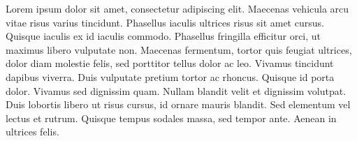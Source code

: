 \label{an:dinamica-das-classes-sociais}

Lorem ipsum dolor sit amet, consectetur adipiscing elit. Maecenas vehicula arcu vitae risus varius tincidunt. Phasellus iaculis ultrices risus sit amet cursus. Quisque iaculis ex id iaculis commodo. Phasellus fringilla efficitur orci, ut maximus libero vulputate non. Maecenas fermentum, tortor quis feugiat ultrices, dolor diam molestie felis, sed porttitor tellus dolor ac leo. Vivamus tincidunt dapibus viverra. Duis vulputate pretium tortor ac rhoncus. Quisque id porta dolor. Vivamus sed dignissim quam. Nullam blandit velit et dignissim volutpat. Duis lobortis libero ut risus cursus, id ornare mauris blandit. Sed elementum vel lectus et rutrum. Quisque tempus sodales massa, sed tempor ante. Aenean in ultrices felis.

